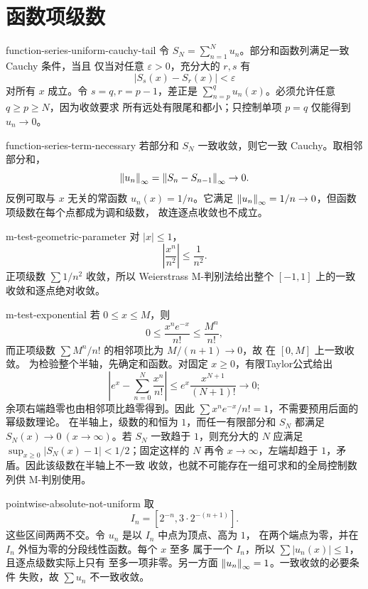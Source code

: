 \chapter{函数项级数}
\label{chap:function-series-solutions}

\begin{solution}{function-series-uniform-cauchy-tail}
令 \(S_N=\sum_{n=1}^Nu_n\)。部分和函数列满足一致 Cauchy 条件，当且
仅当对任意 \(\varepsilon>0\)，充分大的 \(r,s\) 有
\[
 |S_s(x)-S_r(x)|<\varepsilon
\]
对所有 \(x\) 成立。令 \(s=q,r=p-1\)，差正是
\(\sum_{n=p}^qu_n(x)\)。必须允许任意 \(q\ge p\ge N\)，因为收敛要求
所有远处有限尾和都小；只控制单项 \(p=q\) 仅能得到 \(u_n\to0\)。
\end{solution}

\begin{solution}{function-series-term-necessary}
若部分和 \(S_N\) 一致收敛，则它一致 Cauchy。取相邻部分和，
\[
 \left\lVert u_n\right\rVert_\infty=\left\lVert S_n-S_{n-1}\right\rVert_\infty\to0.
\]
反例可取与 \(x\) 无关的常函数 \(u_n(x)=1/n\)。它满足
\(\left\lVert u_n\right\rVert_\infty=1/n\to0\)，但函数项级数在每个点都成为调和级数，
故连逐点收敛也不成立。
\end{solution}

\begin{solution}{m-test-geometric-parameter}
对 \(|x|\le1\)，
\[
 \left|\frac{x^n}{n^2}\right|\le\frac1{n^2}.
\]
正项级数 \(\sum1/n^2\) 收敛，所以 Weierstrass M-判别法给出整个
\([-1,1]\) 上的一致收敛和逐点绝对收敛。
\end{solution}

\begin{solution}{m-test-exponential}
若 \(0\le x\le M\)，则
\[
 0\le\frac{x^ne^{-x}}{n!}\le\frac{M^n}{n!},
\]
而正项级数 \(\sum M^n/n!\) 的相邻项比为 \(M/(n+1)\to0\)，故
在 \([0,M]\) 上一致收敛。
为检验整个半轴，先确定和函数。对固定 \(x\ge0\)，有限Taylor公式给出
\[
 \left|e^x-\sum_{n=0}^N\frac{x^n}{n!}\right|
 \le e^x\frac{x^{N+1}}{(N+1)!}\longrightarrow0;
\]
余项右端趋零也由相邻项比趋零得到。因此
\(\sum x^ne^{-x}/n!=1\)，不需要预用后面的幂级数理论。
在半轴上，级数的和恒为 \(1\)，而任一有限部分和 \(S_N\) 都满足
\(S_N(x)\to0\ (x\to\infty)\)。若 \(S_N\) 一致趋于 \(1\)，则充分大的
\(N\) 应满足 \(\sup_{x\ge0}|S_N(x)-1|<1/2\)；固定这样的 \(N\) 再令
\(x\to\infty\)，左端却趋于 \(1\)，矛盾。因此该级数在半轴上不一致
收敛，也就不可能存在一组可求和的全局控制数列供 M-判别使用。
\end{solution}

\begin{solution}{pointwise-absolute-not-uniform}
取
\[
 I_n=[2^{-n},3\cdot2^{-(n+1)}].
\]
这些区间两两不交。令 \(u_n\) 是以 \(I_n\) 中点为顶点、高为 \(1\)，
在两个端点为零，并在 \(I_n\) 外恒为零的分段线性函数。每个 \(x\) 至多
属于一个 \(I_n\)，所以 \(\sum|u_n(x)|\le1\)，且逐点级数实际上只有
至多一项非零。另一方面 \(\left\lVert u_n\right\rVert_\infty=1\)。一致收敛的必要条件
失败，故 \(\sum u_n\) 不一致收敛。
\end{solution}

